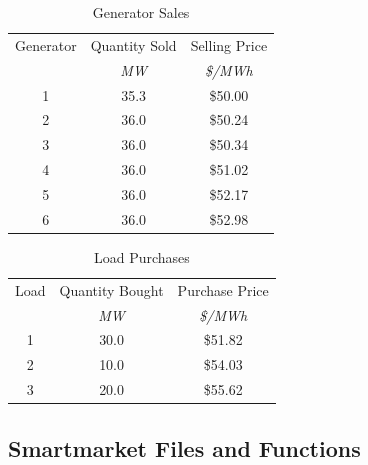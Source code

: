\documentclass[12pt]{article}
\numberwithin{equation}{section}
\numberwithin{table}{section}
\numberwithin{figure}{section}
\begin{document}
\begin{appendices}
\begin{table}[!ht]
\centering
\begin{threeparttable}
\caption{Generator Sales}
\label{tab:sales}
\footnotesize
\begin{tabular}{ccc}
\toprule
Generator & Quantity Sold & Selling Price \\
 & {\footnotesize \it MW} & {\footnotesize \it \$/MWh} \\
\midrule
1	& 35.3	& \$50.00 \\
2	& 36.0	& \$50.24 \\
3	& 36.0	& \$50.34 \\
4	& 36.0	& \$51.02 \\
5	& 36.0	& \$52.17 \\
6	& 36.0	& \$52.98 \\
\bottomrule
\end{tabular}
\end{threeparttable}
\end{table}

\begin{table}[!ht]
\centering
\begin{threeparttable}
\caption{Load Purchases}
\label{tab:purchases}
\footnotesize
\begin{tabular}{ccc}
\toprule
Load & Quantity Bought & Purchase Price \\
 & {\footnotesize \it MW} & {\footnotesize \it \$/MWh} \\
\midrule
1	& 30.0	& \$51.82 \\
2	& 10.0	& \$54.03 \\
3	& 20.0	& \$55.62 \\
\bottomrule
\end{tabular}
\end{threeparttable}
\end{table}

\pagebreak
\subsection{Smartmarket Files and Functions}


\end{appendices}
\end{document}
